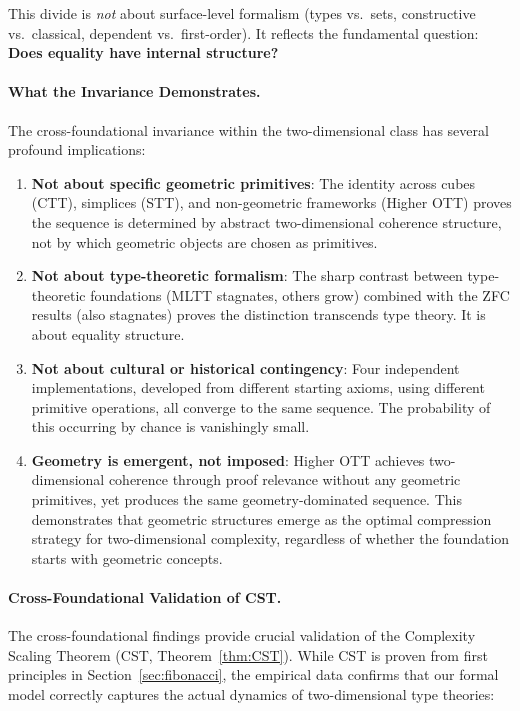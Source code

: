 \documentclass[11pt]{article}
\theoremstyle{definition}
\theoremstyle{remark}
\begin{document}
This divide is \emph{not} about surface-level formalism (types vs.\ sets, constructive vs.\ classical, dependent vs.\ first-order). It reflects the fundamental question: \textbf{Does equality have internal structure?}

\paragraph{What the Invariance Demonstrates.}

The cross-foundational invariance within the two-dimensional class has several profound implications:

\begin{enumerate}
\item \textbf{Not about specific geometric primitives}: The identity across cubes (CTT), simplices (STT), and non-geometric frameworks (Higher OTT) proves the sequence is determined by abstract two-dimensional coherence structure, not by which geometric objects are chosen as primitives.

\item \textbf{Not about type-theoretic formalism}: The sharp contrast between type-theoretic foundations (MLTT stagnates, others grow) combined with the ZFC results (also stagnates) proves the distinction transcends type theory. It is about equality structure.

\item \textbf{Not about cultural or historical contingency}: Four independent implementations, developed from different starting axioms, using different primitive operations, all converge to the same sequence. The probability of this occurring by chance is vanishingly small.

\item \textbf{Geometry is emergent, not imposed}: Higher OTT achieves two-dimensional coherence through proof relevance without any geometric primitives, yet produces the same geometry-dominated sequence. This demonstrates that geometric structures emerge as the optimal compression strategy for two-dimensional complexity, regardless of whether the foundation starts with geometric concepts.
\end{enumerate}

\paragraph{Cross-Foundational Validation of CST.}

The cross-foundational findings provide crucial validation of the Complexity Scaling Theorem (CST, Theorem~\ref{thm:CST}). While CST is proven from first principles in Section~\ref{sec:fibonacci}, the empirical data confirms that our formal model correctly captures the actual dynamics of two-dimensional type theories:
\end{document}
